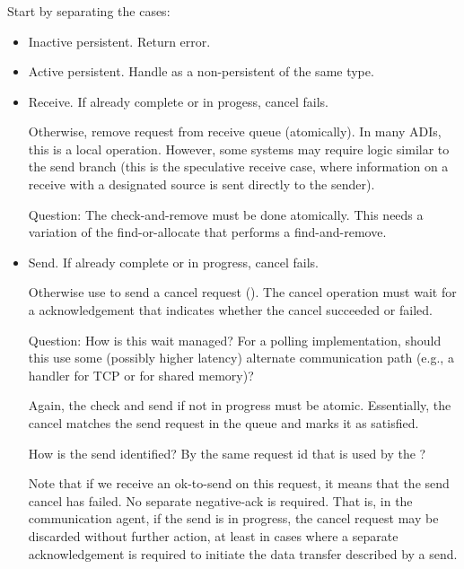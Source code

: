 \documentclass{article}
\begin{document}
\subsubsection{}
\begin{adi3}
\begin{mmadi}
Start by separating the cases:
\begin{itemize}
\item Inactive persistent.  Return error.
\item Active persistent.  Handle as a non-persistent of the same type.
\item Receive.  If already complete or in progess, cancel fails.  
\begin{core} 
Otherwise, remove request from receive queue (atomically).  In many
ADIs, this is a local operation.  However, some systems may require
logic similar to the send branch (this is the speculative receive
case, where information on a receive with a designated source is sent
directly to the sender).

Question: The check-and-remove must be done atomically.  This needs a
variation of the find-or-allocate that performs a find-and-remove.

\end{core}
\item Send. If already complete or in progress, cancel fails.
\begin{core} 
Otherwise use  to send a cancel
request ().  The cancel operation must wait for a
acknowledgement that 
indicates whether the cancel succeeded or failed.  

Question: How is this wait managed?  For a polling implementation, should this
use some (possibly higher latency) alternate communication path (e.g., a
 handler for TCP or  for shared memory)?

Again, the check and send if not in progress must be atomic.  
Essentially, the cancel matches the send request in the queue and
marks it as satisfied.

How is the send identified?  By the same request id that is used by
the ?  

Note that if we receive an ok-to-send on this request, it means that
the send cancel has failed.  No separate negative-ack is required.
That is, in the communication agent, if the send is in progress, the
cancel request may be discarded without further action, at least in
cases where a separate acknowledgement is required to initiate the
data transfer described by a send.
\end{core}
\end{itemize}
\end{mmadi}
\end{adi3}
\end{document}
